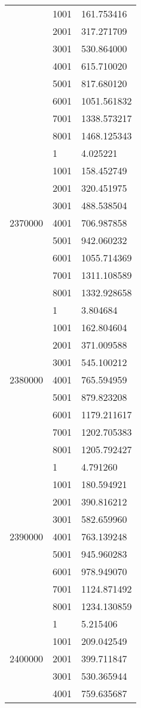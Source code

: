 \begin{table}[htb!]
\begin{tabular}{lll}
 & 1001 & 161.753416 \\
 & 2001 & 317.271709 \\
 & 3001 & 530.864000 \\
 & 4001 & 615.710020 \\
 & 5001 & 817.680120 \\
 & 6001 & 1051.561832 \\
 & 7001 & 1338.573217 \\
 & 8001 & 1468.125343 \\
\multirow[c]{9}{*}{2370000} & 1 & 4.025221 \\
 & 1001 & 158.452749 \\
 & 2001 & 320.451975 \\
 & 3001 & 488.538504 \\
 & 4001 & 706.987858 \\
 & 5001 & 942.060232 \\
 & 6001 & 1055.714369 \\
 & 7001 & 1311.108589 \\
 & 8001 & 1332.928658 \\
\multirow[c]{9}{*}{2380000} & 1 & 3.804684 \\
 & 1001 & 162.804604 \\
 & 2001 & 371.009588 \\
 & 3001 & 545.100212 \\
 & 4001 & 765.594959 \\
 & 5001 & 879.823208 \\
 & 6001 & 1179.211617 \\
 & 7001 & 1202.705383 \\
 & 8001 & 1205.792427 \\
\multirow[c]{9}{*}{2390000} & 1 & 4.791260 \\
 & 1001 & 180.594921 \\
 & 2001 & 390.816212 \\
 & 3001 & 582.659960 \\
 & 4001 & 763.139248 \\
 & 5001 & 945.960283 \\
 & 6001 & 978.949070 \\
 & 7001 & 1124.871492 \\
 & 8001 & 1234.130859 \\
\multirow[c]{9}{*}{2400000} & 1 & 5.215406 \\
 & 1001 & 209.042549 \\
 & 2001 & 399.711847 \\
 & 3001 & 530.365944 \\
 & 4001 & 759.635687 \\

\end{tabular}
\end{table}
